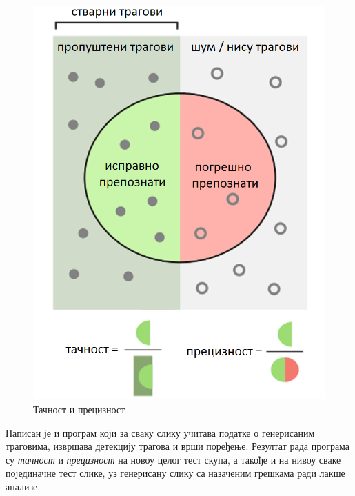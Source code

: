 \documentclass[11pt,a4paper,serbian,oneside]{book}
\begin{document}
\begin{figure}[H]
\begin{center}
\includegraphics[width=120mm]{images/recall_prec.png}
\end{center}
\caption{Тачност и прецизност}
\label{fig:recall_prec}
\end{figure}

Написан је и програм који за сваку слику учитава податке о генерисаним траговима, извршава детекцију трагова и врши поређење. Резултат рада програма су \textit{тачност} и \textit{прецизност} на новоу целог тест скупа, а такође и на нивоу сваке појединачне тест слике, уз генерисану слику са назаченим грешкама ради лакше анализе.
\end{document}
